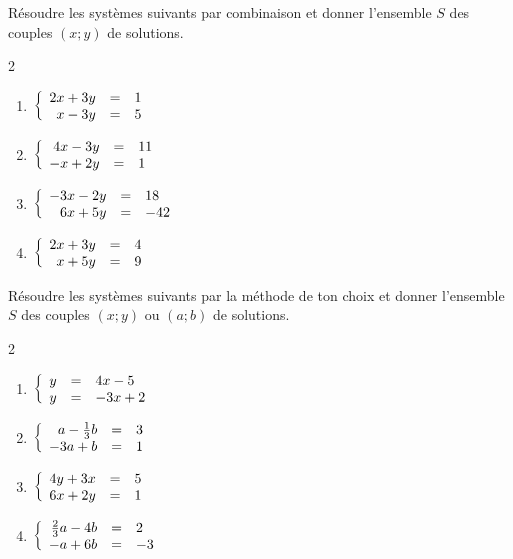 \documentclass[10pt,a4paper,openany,twoside, eleve]{book}
\begin{document}
\begin{exercicesnofoot}
\begin{exo}
   \end{exo}
   \begin{exo}
      Résoudre les systèmes suivants par combinaison et donner l'ensemble $S$ des couples $(x;y)$ de solutions.
      \begin{multicols}{2}
         \begin{enumerate}
            \item $\left\{\begin{array}{rcl} 
               2x	+	3y	&=&	1 \\
x	-	3y	&=&	5
             \end{array}\right.$
            \item $\left\{\begin{array}{rcl} 
4x	-	3y	&=&	11 \\
-x	+	2y	&=&	1
             \end{array}\right.$
            \item $\left\{\begin{array}{rcl} 
               -3x	-	2y	&=&	18 \\
               6x	+	5y	&=&	-42
             \end{array}\right.$
            \item $\left\{\begin{array}{rcl} 
               2x+3y&=&4 \\
               x+5y&=&9
             \end{array}\right.$
         \end{enumerate}
      \end{multicols}

   \end{exo}
\vspace{-3mm}
   \begin{exo}

      Résoudre les systèmes suivants par la méthode de ton choix et donner l'ensemble $S$ des couples $(x;y)$ ou $(a;b)$ de solutions.
      \begin{multicols}{2}
      \begin{enumerate}
         \item $\left\{\begin{array}{rcl} 
y&=&4x-5 \\
y&=&-3x+2
          \end{array}\right.$
         \item $\left\{\begin{array}{rcl} 
a-\frac{1}{3}b&=&3 \\
-3a+b&=&1
 \end{array}\right.$
         \item $\left\{\begin{array}{rcl} 
4y+3x&=&5 \\
6x+2y&=&1
          \end{array}\right.$
         \item $\left\{\begin{array}{rcl} 
\frac{2}{3}a-4b&=&2 \\
-a+6b&=&-3
             \end{array}\right.$
         \end{enumerate}
      \end{multicols}
   \end{exo}

\end{exercicesnofoot}
\end{document}
